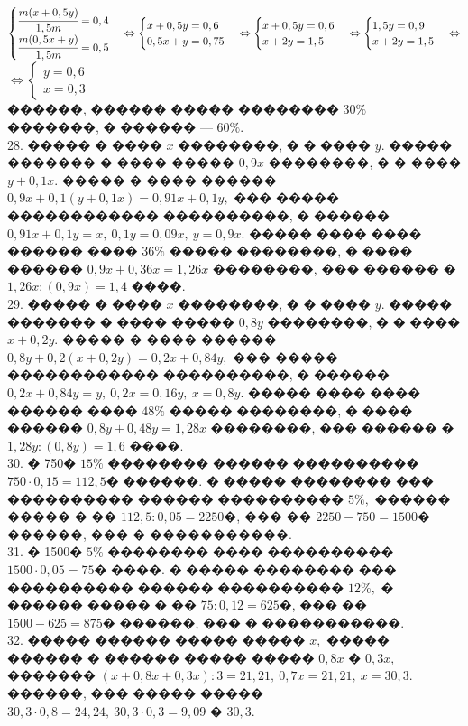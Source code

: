 \documentclass[12pt]{article}
\begin{document}
$\begin{cases}
\cfrac{m(x+0,5y)}{1,5m}=0,4\\
\cfrac{m(0,5x+y)}{1,5m}=0,5
\end{cases}
\Leftrightarrow
\begin{cases}
x+0,5y=0,6\\
0,5x+y=0,75
\end{cases}
\Leftrightarrow
\begin{cases}
x+0,5y=0,6\\
x+2y=1,5
\end{cases}
\Leftrightarrow
\begin{cases}
1,5y=0,9\\
x+2y=1,5
\end{cases}
\Leftrightarrow$\\$\Leftrightarrow
\begin{cases}
y=0,6\\
x=0,3
\end{cases}
$\\
������, ������ ����� �������� $30\%$ �������, � ������ --- $60\%.$\\
28. ����� � ���� $x$ ��������, � � ���� $y.$ ����� ������� � ���� ����� $0,9x$ ��������, � � ���� $y+0,1x.$ ����� � ���� ������ $0,9x+0,1(y+0,1x)=0,91x+0,1y,$ ��� ����� ������������ ����������, � ������ $0,91x+0,1y=x,\ 0,1y=0,09x,\ y=0,9x.$ ����� ���� ���� ������ ���� $36\%$ ����� ��������, � ���� ������ $0,9x+0,36x=1,26x$ ��������, ��� ������ � $1,26x:(0,9x)=1,4$ ����.\\
29. ����� � ���� $x$ ��������, � � ���� $y.$ ����� ������� � ���� ����� $0,8y$ ��������, � � ���� $x+0,2y.$ ����� � ���� ������ $0,8y+0,2(x+0,2y)=0,2x+0,84y,$ ��� ����� ������������ ����������, � ������ $0,2x+0,84y=y,\ 0,2x=0,16y,\ x=0,8y.$ ����� ���� ���� ������ ���� $48\%$ ����� ��������, � ���� ������ $0,8y+0,48y=1,28x$ ��������, ��� ������ � $1,28y:(0,8y)=1,6$ ����.\\
30. � 750� $15\%$ �������� ������ ���������� $750\cdot0,15=112,5$� ������. � ����� �������� ��� ���������� ������ ���������� $5\%,$ ������ ����� � �� $112,5:0,05=2250$�, ��� �� $2250-750=1500$� ������, ��� � �����������.\\
31. � 1500� $5\%$ �������� ���� ���������� $1500\cdot0,05=75$� ����. � ����� �������� ��� ���������� ������ ���������� $12\%,$ � ������ ����� � �� $75:0,12=625$�, ��� �� $1500-625=875$� ������, ��� � �����������.\\
32. ����� ������ ����� ����� $x,$ ����� ������ � ������ ����� ����� $0,8x$ � $0,3x,$ ������� $(x+0,8x+0,3x):3=21,21,\ 0,7x=21,21,\ x=30,3.$ ������, ��� ����� ����� $30,3\cdot0,8=24,24,\ 30,3\cdot0,3=9,09$ � $30,3.$\\
\end{document}
